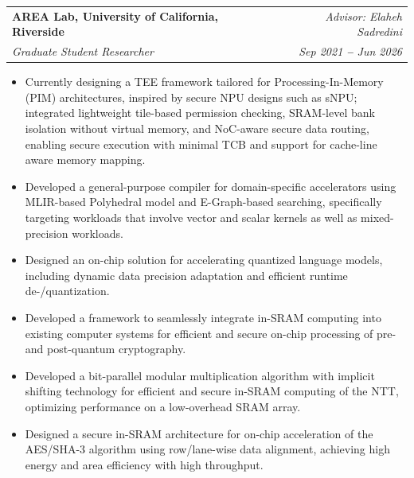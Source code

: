 \documentclass[letterpaper,11pt]{article}
\makeatletter
\newcommand{\resumeItem}[1]{
  \item\small{
    {#1 \vspace{-2pt}}
  }
}
\newcommand{\resumeSubheading}[4]{
  \vspace{-2pt}\item
    \begin{tabular*}{0.97\textwidth}[t]{l@{\extracolsep{\fill}}r}
      \textbf{#1} & #2 \\
      \textit{\small#3} & \textit{\small #4} \\
    \end{tabular*}\vspace{-7pt}
}
\newcommand{\resumeItemListStart}{\begin{itemize}}
\newcommand{\resumeItemListEnd}{\end{itemize}\vspace{-5pt}}
\makeatother
\begin{document}
    \resumeSubheading
      {AREA Lab, University of California, Riverside}{\textit{Advisor: Elaheh Sadredini}}
      {Graduate Student Researcher}{Sep 2021 \textbf{--} Jun 2026}
        \resumeItemListStart
            \resumeItem{Currently designing a TEE framework tailored for Processing-In-Memory (PIM) architectures, inspired by secure NPU designs such as sNPU; integrated lightweight tile-based permission checking, SRAM-level bank isolation without virtual memory, and NoC-aware secure data routing, enabling secure execution with minimal TCB and support for cache-line aware memory mapping.}
            \resumeItem{Developed a general-purpose compiler for domain-specific accelerators using MLIR-based Polyhedral model and E-Graph-based searching, specifically targeting workloads that involve vector and scalar kernels as well as mixed-precision workloads.}
            \resumeItem{Designed an on-chip solution for accelerating quantized language models, including dynamic data precision adaptation and efficient runtime de-/quantization.}
            \resumeItem{Developed a framework to seamlessly integrate in-SRAM computing into existing computer systems for efficient and secure on-chip processing of pre- and post-quantum cryptography.}
            \resumeItem{Developed a bit-parallel modular multiplication algorithm with implicit shifting technology for efficient and secure in-SRAM computing of the NTT, optimizing performance on a low-overhead SRAM array.}
            \resumeItem{Designed a secure in-SRAM architecture for on-chip acceleration of the AES/SHA-3 algorithm using row/lane-wise data alignment, achieving high energy and area efficiency with high throughput.}
        \resumeItemListEnd
    
\end{document}
